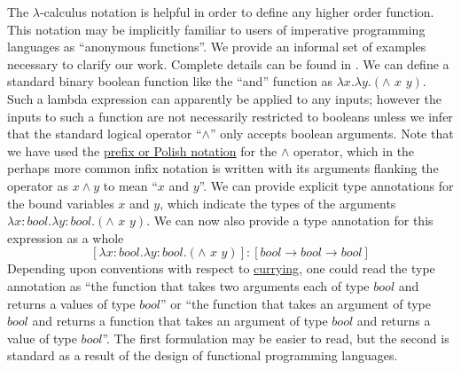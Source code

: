 The $\lambda$-calculus notation is helpful in
order to define any higher order function. This notation may be
implicitly familiar to users of imperative programming languages as ``anonymous functions''. We provide an informal set of examples necessary to clarify our work. Complete details can be found in \cite{Barendregt1985}. We can define a
standard binary boolean function like the ``and'' function as $\lambda x. \lambda y.(\wedge\,\,x\,\,y)$. Such a lambda expression can apparently be applied to any inputs;
however the inputs to such a function are not necessarily restricted to
booleans unless we infer that the standard logical operator
``$\wedge$'' only accepts boolean arguments.
Note that we have used the
\href{http://en.wikipedia.org/wiki/Polish\_notation}{prefix or Polish
notation} for the $\wedge$ operator, which
in the perhaps more common infix notation is written with its arguments
flanking the operator as $x \wedge y$ to mean
``$x$ and
$y$''. We can provide explicit type
annotations for the bound variables $x$
and $y$, which indicate the types of
the arguments $\lambda x:bool. \lambda y:bool.(\wedge\,\,x\,\,y)$. We can now also provide a type annotation for this expression as a whole
\begin{equation}\label{eq:boolfulltype}
[\lambda x:bool. \lambda y:bool.(\wedge\,\,x\,\,y)]:[bool \rightarrow bool \rightarrow bool]
\end{equation}
Depending upon conventions with respect to
\href{http://en.wikipedia.org/wiki/Currying}{currying}, one could read
the type annotation as ``the function that takes two arguments each of
type $bool$ and returns a values of type
$bool$'' or ``the function that takes an
argument of type $bool$ and returns a
function that takes an argument of type
$bool$ and returns a value of type
$bool$''. The first formulation may be
easier to read, but the second is standard as a result of the design of
functional programming languages.

